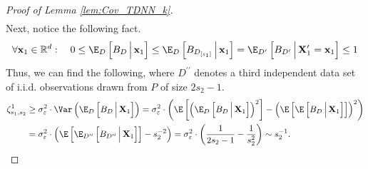 \begin{proof}[Proof of Lemma \ref{lem:Cov_TDNN_k}]
\begin{equation}
\begin{aligned}
		\end{aligned}
	\end{equation}
	Next, notice the following fact.
	\begin{equation}
		\forall \mathbf{x}_1 \in \mathbb{R}^d: \quad 
		0
		\leq \E_D\left[B_D\, \Big| \, \mathbf{x}_1\right] 
		\leq \E_D\left[B_{D_{[s_1]}}\, \Big| \, \mathbf{x}_1\right] 
		= \E_{D'}\left[B_{D'}\, \Big| \, \mathbf{X}_1^{\prime} = \mathbf{x}_1\right] 
		\leq 1
	\end{equation}
	Thus, we can find the following, where $D^{\prime \prime}$ denotes a third independent data set of i.i.d. observations drawn from $P$ of size $2s_2 - 1$.
	\begin{equation}
		\begin{aligned}
			\zeta_{s_1, s_2}^{1}
			& \geq \sigma_{\varepsilon}^{2}\cdot \Var\left(\E_D\left[B_D\, \Big| \, \mathbf{X}_1\right]\right)
			= \sigma_{\varepsilon}^{2}\cdot \left(
				\E\left[\left(\E_D\left[B_D\, \Big| \, \mathbf{X}_1\right]\right)^2\right]
				- \left(\E\left[\E\left[B_D\, \Big| \, \mathbf{X}_1\right]\right]\right)^2
			\right)\\
			& = \sigma_{\varepsilon}^{2}\cdot \left(
				\E\left[\E_{D^{\prime \prime}}\left[B_{D^{\prime \prime}}\, \Big| \, \mathbf{X}_1\right]\right]
				- s_{2}^{-2}
			\right)
			= \sigma_{\varepsilon}^{2}\cdot \left(\frac{1}{2s_2 - 1} - \frac{1}{s_2^2}\right) 
			\sim s_2^{-1}.
		\end{aligned}
	\end{equation}


\end{proof}
